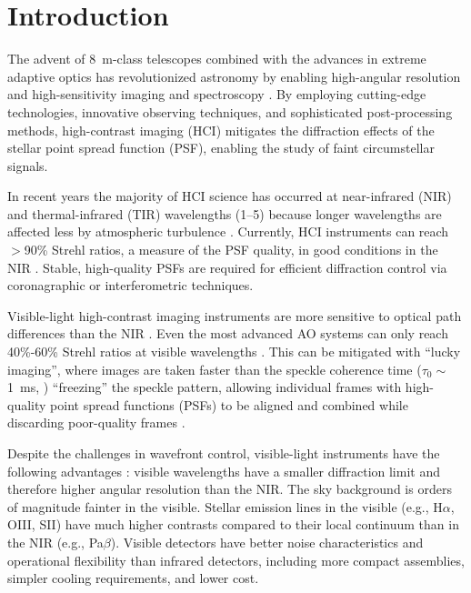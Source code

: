 \section{Introduction}\label{sec:intro}

The advent of \SI{8}{\meter}-class telescopes combined with the advances in extreme adaptive optics has revolutionized astronomy by enabling high-angular resolution and high-sensitivity imaging and spectroscopy \citep{guyon_extreme_2018}. By employing cutting-edge technologies, innovative observing techniques, and sophisticated post-processing methods, high-contrast imaging (HCI) mitigates the diffraction effects of the stellar point spread function (PSF), enabling the study of faint circumstellar signals.

In recent years the majority of HCI science has occurred at near-infrared (NIR) and thermal-infrared (TIR) wavelengths (\SIrange{1}{5}{\micron}) because longer wavelengths are affected less by atmospheric turbulence \citep{fried_optical_1966,roddier_effects_1981}. Currently, HCI instruments can reach $>$90\% Strehl ratios, a measure of the PSF quality, in good conditions in the NIR \citep{beuzit_sphere_2019,lozi_status_2020}. Stable, high-quality PSFs are required for efficient diffraction control via coronagraphic or interferometric techniques.

Visible-light high-contrast imaging instruments are more sensitive to optical path differences than the NIR \citep{fried_optical_1966,roddier_effects_1981}. Even the most advanced AO systems can only reach 40\%-60\% Strehl ratios at visible wavelengths \citep{ahn_scexao_2021,males_magao-x_2022}. This can be mitigated with ``lucky imaging'', where images are taken faster than the speckle coherence time ($\tau_0 \sim$\SI{1}{\milli\second}, \citealp{kooten_climate_2022}) ``freezing'' the speckle pattern, allowing individual frames with high-quality point spread functions (PSFs) to be aligned and combined while discarding poor-quality frames \citep{law_lucky_2006, garrel_highly_2012, lang_tractor_2016}.

Despite the challenges in wavefront control, visible-light instruments have the following advantages \citep{close_into_2014}: visible wavelengths have a smaller diffraction limit and therefore higher angular resolution than the NIR. The sky background is orders of magnitude fainter in the visible. Stellar emission lines in the visible (e.g., H$\alpha$, OIII, SII) have much higher contrasts compared to their local continuum than in the NIR (e.g., Pa$\beta$). Visible detectors have better noise characteristics and operational flexibility than infrared detectors, including more compact assemblies, simpler cooling requirements, and lower cost.

